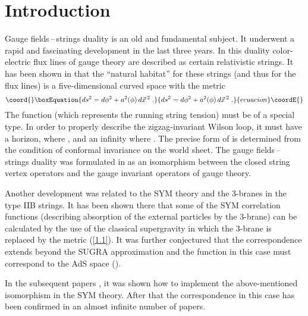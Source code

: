 \documentclass[a4paper,12pt]{article}
\numberwithin{equation}{section}
\begin{document}
\pagebreak


\section{Introduction}

Gauge fields\,--\,strings duality is an old and fundamental subject. It underwent
a rapid and fascinating development in the last three years. In this duality
color-electric flux lines of gauge theory are described as certain relativistic
strings. It has been shown in \cite{1} that the ``natural habitat'' for these
strings (and thus for the flux lines) is a five-dimensional curved space with
the metric
\begin{equation}\coord{}\boxEquation{
\label{1.1}
ds^{2}=d\phi ^{2}+a^{2}(\phi )\, d\vec{x}\, ^{2}\; .
}{
ds^{2}=d\phi ^{2}+a^{2}(\phi )\, d\vec{x}\, ^{2}\; .
}{ecuacion}\coordE{}\end{equation}
The function \coordHE{} (which represents the running string tension)
must be of a special type. In order to properly describe the zigzag-invariant
Wilson loop, it must have a horizon, where \coordHE{}, and an
infinity where \coordHE{}. The precise form of \coordHE{}
is determined from the condition of conformal invariance on the world sheet.
The gauge fields\,--\,strings duality was formulated in \cite{1} as an isomorphism
between the closed string vertex operators and the gauge invariant operators
of gauge theory.

Another development \cite{2} was related to the \coordHE{} SYM theory
and the 3-branes in the type IIB strings. It has been shown there that some
of the SYM correlation functions (describing absorption of the external particles
by the 3-brane) can be calculated by the use of the classical supergravity in
which the 3-brane is replaced by the metric (\ref{1.1}). It was further conjectured
\cite{3} that the correspondence extends beyond the SUGRA approximation and
the function \coordHE{} in this case must correspond to the AdS space
(\coordHE{}).

In the subsequent papers \cite{4},\myHighlight{\( \,  \)}\coordHE{}\cite{5} it was shown how to implement
the above-mentioned isomorphism in the \coordHE{} SYM theory. After
that the correspondence in this case has been confirmed in an almost infinite
number of papers.
\end{document}
